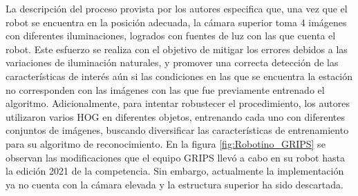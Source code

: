 La descripción del proceso provista por los autores especifica que, una vez que el robot se encuentra en la posición adecuada, la cámara superior toma 4 imágenes con diferentes iluminaciones, logrados con fuentes de luz con las que cuenta el robot. Este esfuerzo se realiza con el objetivo de mitigar los errores debidos a las variaciones de iluminación naturales, y promover una correcta detección de las características de interés aún si las condiciones en las que se encuentra la estación no corresponden con las imágenes con las que fue previamente entrenado el algoritmo. Adicionalmente, para intentar robustecer el procedimiento, los autores utilizaron varios HOG en diferentes objetos, entrenando cada uno con diferentes conjuntos de imágenes, buscando diversificar las características de entrenamiento para su algoritmo de reconocimiento. En la figura \ref{fig:Robotino_GRIPS} se observan las modificaciones que el equipo GRIPS llevó a cabo en su robot hasta la edición 2021 de la competencia. Sin embargo, actualmente la implementación ya no cuenta con la cámara elevada y la estructura superior ha sido descartada.

